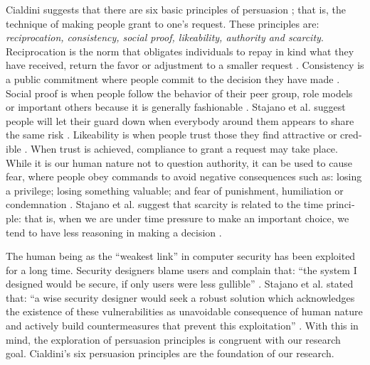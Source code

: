 Cialdini suggests that there are six basic principles of persuasion
\citep{cialdini:2001}; that is, the technique of making people grant
to one's request. These principles are:\textit{ reciprocation, consistency,
social proof, likeability, authority and scarcity}. Reciprocation
is the norm that obligates individuals to repay in kind what they
have received, return the favor or adjustment to a smaller request\foreignlanguage{english}{
\citep{cialdini:2001}. Consistency is a public commitment where people
commit to the decision they have made \citep{workman:2008}\citep{cialdini:2001}.
Social proof is when people follow the behavior of their peer group,
role models or important others because it is generally \textquotedbl{}fashionable\textquotedbl{}
\citep{workman:2008}. Stajano et al. suggest people will let their
guard down when everybody around them appears to share the same risk
\citep{stajano2011understanding}. Likeability is when people trust
those they find attractive or credible \citep{workman:2008,cialdini:2001}.
When trust is achieved, compliance to grant a request may take place.
While it is our human nature not to question authority, it can be
used to cause fear, where people obey commands to avoid negative consequences
such as: losing a privilege; losing something valuable; and fear of
punishment, humiliation or condemnation \citep{cialdini:2001,workman:2008}.
Stajano et al. suggest that scarcity is related to the time principle:
that is, when we are under time pressure to make an important choice,
we tend to have less reasoning in making a decision \citep{stajano2011understanding}. }

The human being as the \textquotedblleft weakest link'' in computer
security has been exploited for a long time. Security designers blame
users and complain that: ``the system I designed would be secure,
if only users were less gullible\textquotedblright{} \citep{stajano2011understanding}.
Stajano et al. stated that: \textquotedblleft a wise security designer
would seek a robust solution which acknowledges the existence of these
vulnerabilities as unavoidable consequence of human nature and actively
build countermeasures that prevent this exploitation\textquotedblright{}
\citep{stajano2011understanding}. With this in mind, the exploration
of persuasion principles is congruent with our research goal. Cialdini's
six persuasion principles are the foundation of our research.

